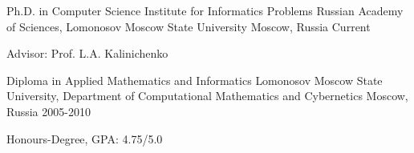 \begin{cventries}
  \cventry
    {Ph.D. in Computer Science}
    {Institute for Informatics Problems Russian Academy of Sciences, 
    Lomonosov Moscow State University}
    {Moscow, Russia}
    {Current}
    {
      \begin{cvitems}
        \item {Advisor: Prof. L.A. Kalinichenko}
      \end{cvitems}
    }
    \cventry
    {Diploma in Applied Mathematics and Informatics}
    {Lomonosov Moscow State University, 
    Department of Computational Mathematics and Cybernetics}
    {Moscow, Russia}
    {2005-2010}
    {
      \begin{cvitems}
        \item {Honours-Degree, GPA: 4.75/5.0}
      \end{cvitems}
    }
\end{cventries}
